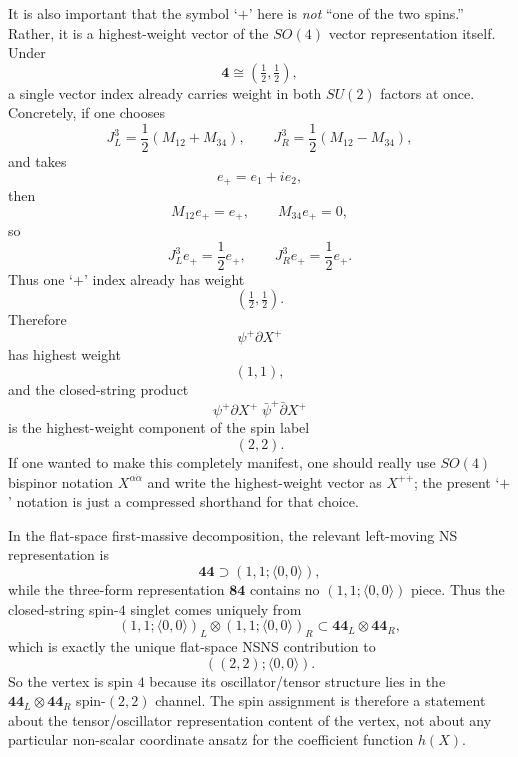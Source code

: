 \documentclass[12pt]{article}
\newcommand{\la}{\langle}
\newcommand{\ra}{\rangle}
\begin{document}
It is also important that the symbol `$+$' here is \emph{not} ``one of the two spins.'' Rather, it is a
highest-weight vector of the $SO(4)$ vector representation itself. Under
\begin{equation}
\mathbf 4 \cong \left(\tfrac12,\tfrac12\right),
\end{equation}
a single vector index already carries weight in both $SU(2)$ factors at once. Concretely, if one chooses
\begin{equation}
J_L^3=\frac12(M_{12}+M_{34}),\qquad
J_R^3=\frac12(M_{12}-M_{34}),
\end{equation}
and takes
\begin{equation}
e_+=e_1+i e_2,
\end{equation}
then
\begin{equation}
M_{12}e_+=e_+,\qquad M_{34}e_+=0,
\end{equation}
so
\begin{equation}
J_L^3 e_+=\frac12 e_+,\qquad
J_R^3 e_+=\frac12 e_+.
\end{equation}
Thus one `$+$' index already has weight
\begin{equation}
\left(\tfrac12,\tfrac12\right).
\end{equation}
Therefore
\begin{equation}
\psi^+\partial X^+
\end{equation}
has highest weight
\begin{equation}
(1,1),
\end{equation}
and the closed-string product
\begin{equation}
\psi^+\partial X^+\;\bar\psi^+\bar\partial X^+
\end{equation}
is the highest-weight component of the spin label
\begin{equation}
(2,2).
\end{equation}
If one wanted to make this completely manifest, one should really use $SO(4)$ bispinor notation
$X^{\alpha\dot\alpha}$ and write the highest-weight vector as $X^{+\dot +}$; the present `$+$' notation is
just a compressed shorthand for that choice.

In the flat-space first-massive decomposition, the relevant left-moving NS representation is
\begin{equation}
\mathbf{44}\supset (1,1;\la 0,0\ra),
\end{equation}
while the three-form representation $\mathbf{84}$ contains no $(1,1;\la 0,0\ra)$ piece. Thus the
closed-string spin-$4$ singlet comes uniquely from
\begin{equation}
(1,1;\la 0,0\ra)_L\otimes (1,1;\la 0,0\ra)_R
\subset \mathbf{44}_L\otimes \mathbf{44}_R,
\end{equation}
which is exactly the unique flat-space NSNS contribution to
\begin{equation}
((2,2);\la 0,0\ra).
\end{equation}
So the vertex is spin $4$ because its oscillator/tensor structure lies in the
$\mathbf{44}_L\otimes \mathbf{44}_R$ spin-$(2,2)$ channel. The spin assignment is therefore a statement
about the tensor/oscillator representation content of the vertex, not about any particular non-scalar
coordinate ansatz for the coefficient function $h(X)$.
\end{document}
